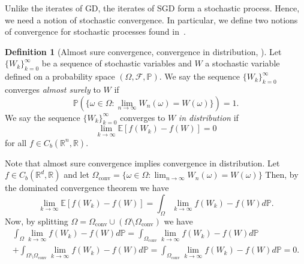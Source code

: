 \documentclass[12pt]{article}
\theoremstyle{definition}
\newtheorem{definition}[definition]{Definition}
\numberwithin{equation}{section}
\newcommand{\R}{\mathbb{R}}
\newcommand{\BP}{\mathbb{P}}
\newcommand{\CF}{\mathcal{F}}
\newcommand{\ev}[1]{\mathbb{E}\left[{#1}\right]}
\begin{document}
Unlike the iterates of GD, the iterates of SGD form a stochastic process. Hence, we need a notion of stochastic convergence. In particular, we define two notions of convergence for stochastic processes found in~\autocite{eAppliedStochasticAnalysis2021}.

\begin{definition}[Almost sure convergence, convergence in distribution, ]
Let $\{W_k\}_{k=0}^{\infty}$ be a sequence of stochastic variables and $W$ a stochastic variable defined on a probability space $(\Omega, \CF, \BP)$. We say the sequence $\{W_k\}_{k=0}^{\infty}$ converges \emph{almost surely} to $W$ if
\begin{equation}
  \BP(\{\omega \in \Omega : \lim_{n \rightarrow \infty}W_n(\omega) = W(\omega)\}) = 1.
\end{equation}
We say the sequence  $\{W_k\}_{k=0}^{\infty}$ converges to $W$ \emph{in distribution} if
  \begin{equation}
    \lim_{k \rightarrow \infty}\ev{f(W_k) - f(W)} = 0
  \end{equation}
  for all $f \in C_b(\R^n, \R)$.
\end{definition}
Note that almost sure convergence implies convergence in distribution. Let $f \in C_b(\R^d, \R)$ and let $\Omega_{\text{conv}} = \{\omega \in \Omega : \lim_{n \rightarrow \infty}W_n(\omega) = W(\omega)\}$ Then, by the dominated convergence theorem we have 
\begin{equation*}
  \lim_{k \rightarrow \infty} \ev{f(W_k) - f(W)} = \int_{\Omega} \lim_{k \rightarrow \infty} f(W_k) - f(W) d\BP.
\end{equation*}
Now, by splitting $\Omega = \Omega_{\text{conv}} \cup (\Omega \setminus \Omega_{\text{conv}})$ we have
\begin{multline*}
  \int_{\Omega} \lim_{k \rightarrow \infty} f(W_k) - f(W) d\BP 
  =\int_{\Omega_{\text{conv}}} \lim_{k \rightarrow \infty} f(W_k) - f(W) d\BP \\
   + \int_{\Omega \setminus \Omega_{\text{conv}}} \lim_{k \rightarrow \infty} f(W_k) - f(W) d\BP = \int_{\Omega_{\text{conv}}} \lim_{k \rightarrow \infty} f(W_k) - f(W) d\BP = 0.
\end{multline*}
\end{document}
